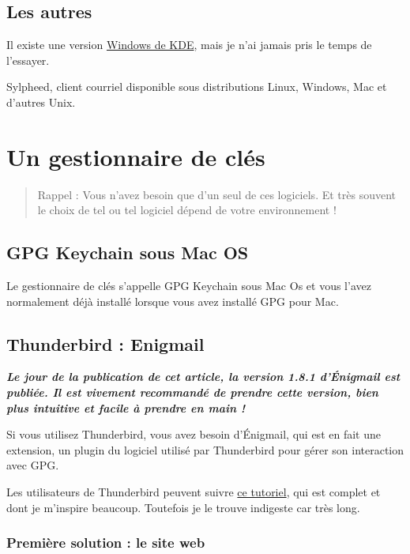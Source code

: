 \subsection{Les autres}\label{les-autres}

Il existe une version \href{https://windows.kde.org/}{Windows de KDE},
mais je n'ai jamais pris le temps de l'essayer.

Sylpheed, client courriel disponible sous distributions Linux, Windows,
Mac et d'autres Unix.

\section{Un gestionnaire de clés}\label{un-gestionnaire-de-cluxe9s}

\begin{quote}
Rappel : Vous n'avez besoin que d'un seul de ces logiciels. Et très
souvent le choix de tel ou tel logiciel dépend de votre environnement !
\end{quote}

\subsection{GPG Keychain sous Mac OS}\label{gpg-keychain-sous-mac-os}

Le gestionnaire de clés s'appelle GPG Keychain sous Mac Os et vous
l'avez normalement déjà installé lorsque vous avez installé GPG pour
Mac.

\subsection{Thunderbird : Enigmail}\label{thunderbird-enigmail}

\textbf{\emph{Le jour de la publication de cet article, la version 1.8.1
d'Énigmail est publiée. Il est vivement recommandé de prendre cette
version, bien plus intuitive et facile à prendre en main !}}

Si vous utilisez Thunderbird, vous avez besoin d'Énigmail, qui est en
fait une extension, un plugin du logiciel utilisé par Thunderbird pour
gérer son interaction avec GPG.

Les utilisateurs de Thunderbird peuvent suivre
\href{http://lehollandaisvolant.net/tuto/gpg/\#i2}{ce tutoriel}, qui est
complet et dont je m'inspire beaucoup. Toutefois je le trouve indigeste
car très long.

\subsubsection{Première solution : le site web}\label{premiuxe8re-solution-le-site-web}

